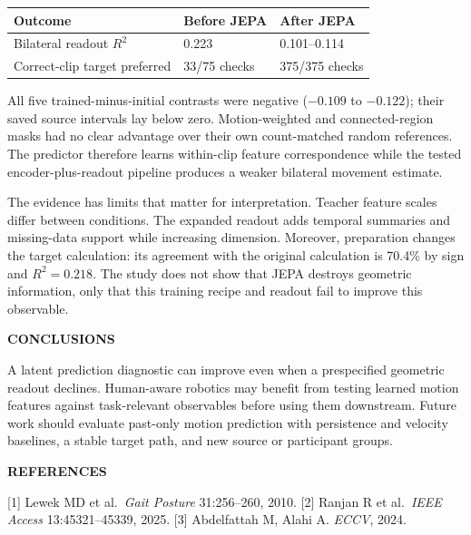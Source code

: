 \documentclass[11pt,letterpaper]{article}
\renewcommand{\subsection}[1]{\vspace{2pt}\noindent\textbf{#1}\par\vspace{1pt}}
\begin{document}
{\def\LTcaptype{none} %
\begin{tabular}{@{}p{}p{}p{}@{}}
\toprule\noalign{}
Outcome & Before JEPA & After JEPA \\
\midrule\noalign{}
Bilateral readout \(R^2\) & 0.223 & 0.101--0.114 \\
Correct-clip target preferred & 33/75 checks & 375/375 checks \\
\end{tabular}
}

All five trained-minus-initial contrasts were negative (\(-0.109\) to
\(-0.122\)); their saved source intervals lay below zero.
Motion-weighted and connected-region masks had no clear advantage over
their own count-matched random references. The predictor therefore
learns within-clip feature correspondence while the tested
encoder-plus-readout pipeline produces a weaker bilateral movement
estimate.

The evidence has limits that matter for interpretation. Teacher feature
scales differ between conditions. The expanded readout adds temporal
summaries and missing-data support while increasing dimension. Moreover,
preparation changes the target calculation: its agreement with the
original calculation is 70.4\% by sign and \(R^2=0.218\). The study does
not show that JEPA destroys geometric information, only that this
training recipe and readout fail to improve this observable.

\subsection{CONCLUSIONS}\label{conclusions}

A latent prediction diagnostic can improve even when a prespecified
geometric readout declines. Human-aware robotics may benefit from
testing learned motion features against task-relevant observables before
using them downstream. Future work should evaluate past-only motion
prediction with persistence and velocity baselines, a stable target
path, and new source or participant groups.

\subsection{REFERENCES}\label{references}

{[}1{]} Lewek MD et al.~\emph{Gait Posture} 31:256--260, 2010. {[}2{]}
Ranjan R et al.~\emph{IEEE Access} 13:45321--45339, 2025. {[}3{]}
Abdelfattah M, Alahi A. \emph{ECCV}, 2024.
\end{document}
